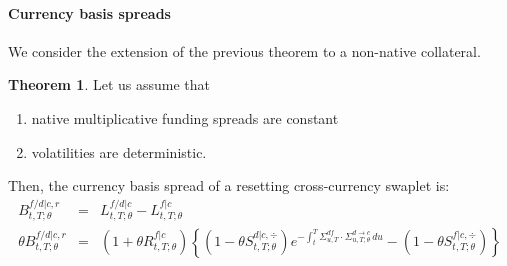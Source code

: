 \documentclass[11pt,english]{amsart}
\theoremstyle{definition}
\newtheorem*{theo*}{Theorem}
\begin{document}
\paragraph{Currency basis spreads}

We consider the extension of the previous theorem to a non-native collateral. 
\begin{theo*}
Let us assume that 
\begin{enumerate}
\item native multiplicative funding spreads are constant
\item volatilities are deterministic.
\end{enumerate}
Then, the currency basis spread of a resetting cross-currency swaplet is:
\begin{eqnarray}
   B^{f/d|c,r}_{t,T;\theta}  
   &=& L^{f/d|c}_{t,T;\theta}  - L^{f|c}_{t,T;\theta}   \\
   \theta B^{f/d|c,r}_{t,T;\theta}  &=& (1+\theta R^{f|c}_{t,T;\theta}) \left\{ (1-\theta S^{d|c,\div}_{t,T;\theta}) e^{ - \int_t^T \Sigma^{df}_{u,T} \cdot \Sigma^{d\to c}_{u,T;\theta} \,du } - (1-\theta S^{f|c,\div}_{t,T;\theta}) \right\}
\end{eqnarray} 
\end{theo*}
\end{document}
